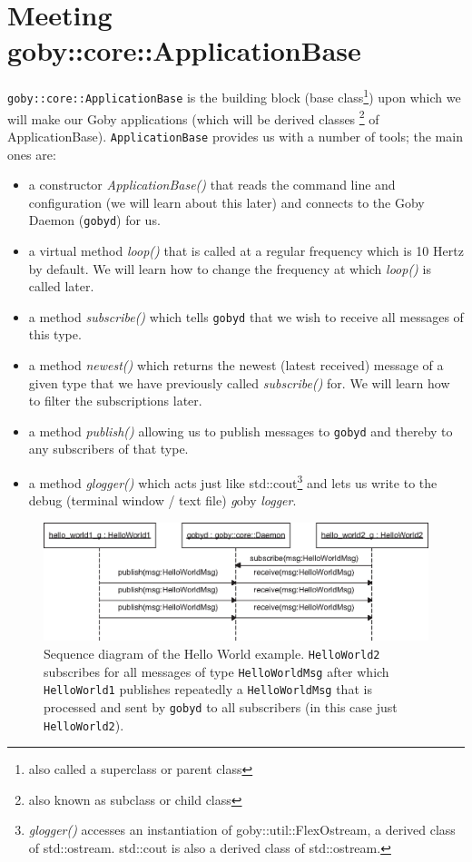 \documentclass[11pt, letterpaper, oneside]{memoir}
\begin{document}
\section{Meeting goby::core::ApplicationBase}

\verb|goby::core::ApplicationBase| is the building block (base class\footnote{also called a superclass or parent class}) upon which we will make our Goby applications (which will be derived classes \footnote{also known as subclass or child class} of ApplicationBase). \verb|ApplicationBase| provides us with a number of tools; the main ones are:

\begin{itemize}
\item a constructor \textit{ApplicationBase()} that reads the command line and configuration (we will learn about this later) and connects to the Goby Daemon (\verb|gobyd|) for us.
\item a virtual method \textit{loop()} that is called at a regular frequency which is 10 Hertz by default. We will learn how to change the frequency at which \textit{loop()} is called later. 
\item a method \textit{subscribe()} which tells \verb|gobyd| that we wish to receive all messages of this type.
\item a method \textit{newest()} which returns the newest (latest received) message of a given type that we have previously called \textit{subscribe()} for. We will learn how to filter the subscriptions later.
\item a method \textit{publish()} allowing us to publish messages to \verb|gobyd| and thereby to any subscribers of that type.
\item a method \textit{glogger()} which acts just like std::cout\footnote{\textit{glogger()} accesses an instantiation of goby::util::FlexOstream, a derived class of std::ostream. std::cout is also a derived class of std::ostream.} and lets us write to the debug (terminal window / text file) \textit{g}oby \textit{logger}.
\end{itemize}


\begin{figure}
\centering
\includegraphics[scale=0.9]{hello_world_sequence}
\caption{Sequence diagram of the Hello World example. \texttt{HelloWorld2} subscribes for all messages of type \texttt{HelloWorldMsg} after which \texttt{HelloWorld1} publishes repeatedly a \texttt{HelloWorldMsg} that is processed and sent by \texttt{gobyd} to all subscribers (in this case just \texttt{HelloWorld2}).}
\label{fig:hellow_world_sequence}
\end{figure}
\end{document}
